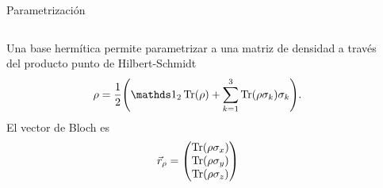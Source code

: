 \begin{frame}{Parametrización}
    \begin{columns}
        \begin{column}{0.5\textwidth}
            Una base hermítica permite parametrizar a una matriz de densidad a través del producto punto de Hilbert-Schmidt
            \begin{equation}
                \rho=\frac{1}{2}\qty(\Id_{2}\Tr(\rho)+\sum_{k=1}^{3}\Tr(\rho\pauli{k})\pauli{k}).\nonumber
            \end{equation}
            \pause
            El vector de Bloch es
            \begin{equation}
                \vec{r}_{\rho}=\begin{pmatrix}
                    \Tr(\rho\sigma_{x})\\
                    \Tr(\rho\sigma_{y})\\
                    \Tr(\rho\sigma_{z})
                \end{pmatrix}\nonumber
            \end{equation}
        \end{column}
        \pause
        \begin{column}{0.5\textwidth}
            \centering
            \BlochSphereDensity
        \end{column}
    \end{columns}
\end{frame}


